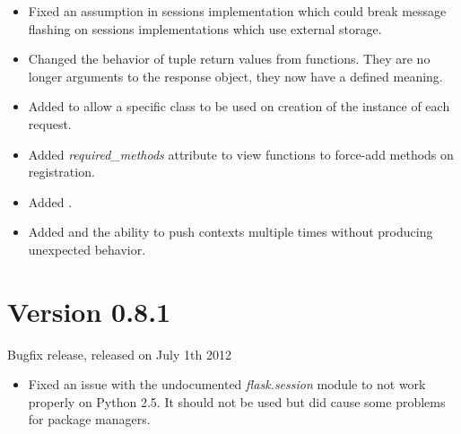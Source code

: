 \documentclass[a4paper,12pt]{sphinxmanual}
\begin{document}
\begin{itemize}
\item {} 
Fixed an assumption in sessions implementation which could break message
flashing on sessions implementations which use external storage.

\item {} 
Changed the behavior of tuple return values from functions.  They are no
longer arguments to the response object, they now have a defined meaning.

\item {} 
Added {\hyperref[api:flask.Flask.request_globals_class]{}} to allow a specific class to
be used on creation of the {\hyperref[api:flask.g]{}} instance of each request.

\item {} 
Added \emph{required\_methods} attribute to view functions to force-add methods
on registration.

\item {} 
Added .

\item {} 
Added {\hyperref[api:flask.stream_with_context]{}} and the ability to push contexts
multiple times without producing unexpected behavior.

\end{itemize}


\section{Version 0.8.1}
\label{changelog:version-0-8-1}
Bugfix release, released on July 1th 2012
\begin{itemize}
\item {} 
Fixed an issue with the undocumented \emph{flask.session} module to not
work properly on Python 2.5.  It should not be used but did cause
some problems for package managers.

\end{itemize}
\end{document}
